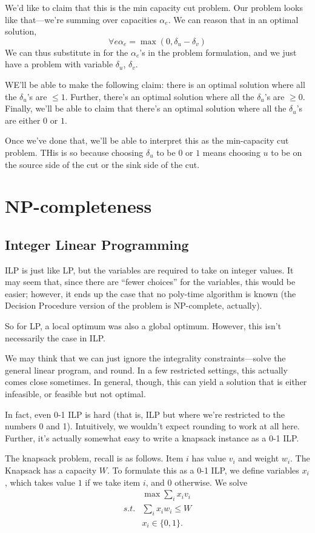\documentclass{article}
\begin{document}
We'd like to claim that this is the min capacity cut problem. Our problem
looks like that---we're summing over capacities $\alpha_e$.
We can reason that in an optimal solution,
$$
\forall e \alpha_e = \max(0, \delta_u - \delta_v)
$$
We can thus substitute in for the $\alpha_e$'s in the problem formulation,
and we just have a problem with variable $\delta_u$, $\delta_v$.

WE'll be able to make the following claim: there is an optimal solution
where all the $\delta_u$'s are $\leq 1$.
Further, there's an optimal solution where all the $\delta_u$'s are $\geq 0$.
Finally, we'll be able to claim that there's an optimal solution where
all the $\delta_u$'s are either $0$ or $1$.

Once we've done that, we'll be able to interpret this as the min-capacity
cut problem. THis is so because choosing $\delta_u$ to be $0$
or $1$ means choosing $u$ to be on the source side of the cut or the sink
side of the cut.


\section{NP-completeness}

\subsection{Integer Linear Programming}

ILP is just like LP, but the variables are required to take on integer values.
It may seem that, since there are ``fewer choices'' for the variables,
this would be easier; however, it ends up the case that no poly-time
algorithm is known (the Decision Procedure version of the problem is 
NP-complete, actually).

So for LP, a local optimum was also a global optimum. However, this isn't
necessarily the case in ILP.

We may think that we can just ignore the integrality constraints---solve the
general linear program, and round. In a few restricted settings, this actually
comes close sometimes. In general, though, this can yield a solution
that is either infeasible, or feasible but not optimal.

In fact, even 0-1 ILP is hard (that is, ILP but where we're restricted to
the numbers 0 and 1). Intuitively, we wouldn't expect rounding to work at
all here. Further, it's actually somewhat easy to write a knapsack instance
as a 0-1 ILP.

The knapsack problem, recall is as follows. Item $i$ has value $v_i$ and
weight $w_i$. The Knapsack has a capacity $W$.
To formulate this as a 0-1 ILP, we define variables $x_i$, which takes
value $1$ if we take item $i$, and $0$ otherwise.
We solve
\begin{align}
& \max \sum_i x_i v_i \\
s.t. & \sum_i x_i w_i \leq W \\
& x_i \in \{0,1\}.
\end{align}
\end{document}
